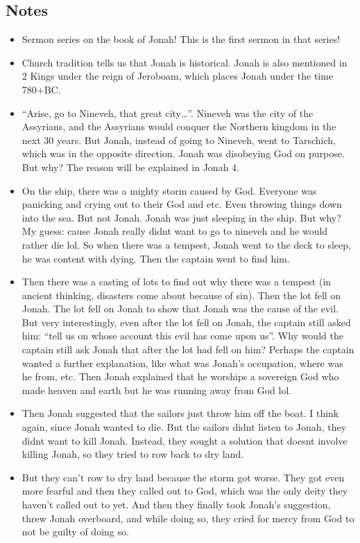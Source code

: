 \subsection*{Notes}
\begin{itemize}
  \item{Sermon series on the book of Jonah! This is the first sermon in that series!}
  \item{Church tradition tells us that Jonah is historical. Jonah is also mentioned in 2 Kings under the reign of Jeroboam, which places Jonah under the time 780+BC.}
  \item{“Arise, go to Nineveh, that great city…”. Nineveh was the city of the Assyrians, and the Assyrians would conquer the Northern kingdom in the next 30 years. But Jonah, instead of going to Nineveh, went to Tarschich, which was in the opposite direction. Jonah was disobeying God on purpose. But why? The reason will be explained in Jonah 4.}
  \item{On the ship, there was a mighty storm caused by God. Everyone was
  panicking and crying out to their God and etc. Even throwing things down
  into the sea. But not Jonah. Jonah was just sleeping in the ship. But why?
  My guess: cause Jonah really didnt want to go to nineveh and he would
  rather die lol. So when there was a tempest, Jonah went to the deck to
  sleep, he was content with dying. Then the captain went to find him.}
  \item{Then there was a casting of lots to find out why there was a tempest
  (in ancient thinking, disasters come about because of sin). Then the lot
  fell on Jonah. The lot fell on Jonah to show that Jonah was the cause of
  the evil. But very interestingly, even after the lot fell on Jonah, the
  captain still asked him: “tell us on whose account this evil has come upon
  us”. Why would the captain still ask Jonah that after the lot had fell on
  him? Perhaps the captain wanted a further explanation, like what was
  Jonah’s occupation, where was he from, etc. Then Jonah explained that he
  worships a sovereign God who made heaven and earth but he was running away
  from God lol.}
  \item{Then Jonah suggested that the sailors just throw him off the boat. I think again, since Jonah wanted to die. But the sailors didnt listen to Jonah, they didnt want to kill Jonah. Instead, they sought a solution that doesnt involve killing Jonah, so they tried to row back to dry land.}
  \item{But they can’t row to dry land because the storm got worse. They got even more fearful and then they called out to God, which was the only deity they haven’t called out to yet. And then they finally took Jonah’s suggestion, threw Jonah overboard, and while doing so, they cried for mercy from God to not be guilty of doing so. }

\end{itemize}
